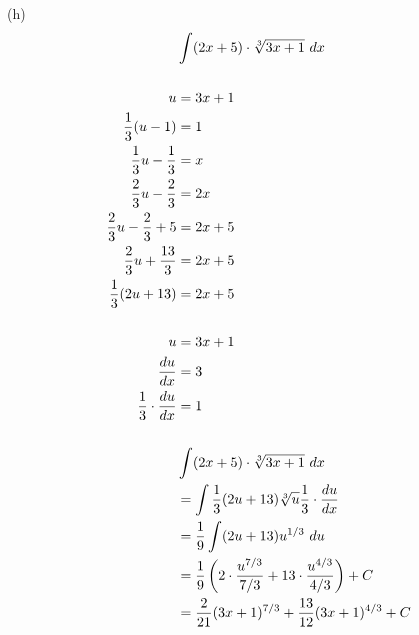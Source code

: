 \begin{exercise}
    (h)
    \begin{align}
                                        & \int (2x + 5) \cdot \sqrt[3]{3x + 1} \ dx                                                    \\
        \\
        u                               & = 3x + 1                                                                                     \\
        {1 \over 3}(u - 1)              & = 1                                                                                          \\
        {1 \over 3}u - {1 \over 3}      & = x                                                                                          \\
        {2 \over 3}u - {2 \over 3}      & = 2x                                                                                         \\
        {2 \over 3}u - {2 \over 3} + 5  & = 2x + 5                                                                                     \\
        {2 \over 3}u + {13 \over 3}     & = 2x + 5                                                                                     \\
        {1 \over 3}(2u + 13)            & = 2x + 5                                                                                     \\
        \\
        u                               & = 3x + 1                                                                                     \\
        {du \over dx}                   & = 3                                                                                          \\
        {1 \over 3} \cdot {du \over dx} & = 1                                                                                          \\
        \\
                                        & \int (2x + 5) \cdot \sqrt[3]{3x + 1} \ dx                                                    \\
                                        & = \int {1 \over 3}(2u + 13) \sqrt[3]{u} {1 \over 3} \cdot {du \over dx}                      \\
                                        & = {1 \over 9} \int (2u + 13) u^{1/3} \ du                                                    \\
                                        & = {1 \over 9}\left(2 \cdot {u^{7/3} \over {7/3}} + 13 \cdot {u^{4/3} \over {4/3}}\right) + C \\
                                        & = {2 \over 21}(3x + 1)^{7/3} + {13 \over 12}(3x + 1)^{4/3} + C
    \end{align}
\end{exercise}

